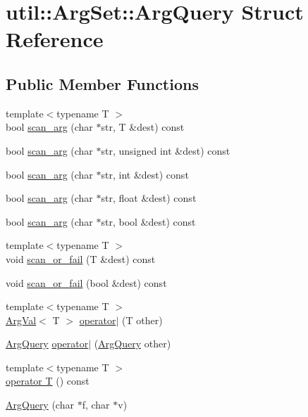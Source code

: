 \hypertarget{structutil_1_1ArgSet_1_1ArgQuery}{\section{util\-:\-:Arg\-Set\-:\-:Arg\-Query Struct Reference}
\label{structutil_1_1ArgSet_1_1ArgQuery}
}
\subsection*{Public Member Functions}
\begin{DoxyCompactItemize}
\item 
{\footnotesize template$<$typename T $>$ }\\bool \hyperlink{structutil_1_1ArgSet_1_1ArgQuery_a501daf29023e9ded1ba2d652251c3b9e}{scan\-\_\-arg} (char $\ast$str, T \&dest) const 
\item 
bool \hyperlink{structutil_1_1ArgSet_1_1ArgQuery_ac9c13ea0a2331353191ff437d2e527a9}{scan\-\_\-arg} (char $\ast$str, unsigned int \&dest) const 
\item 
bool \hyperlink{structutil_1_1ArgSet_1_1ArgQuery_add2d0c50323c1753c95bd4a57f2ea32d}{scan\-\_\-arg} (char $\ast$str, int \&dest) const 
\item 
bool \hyperlink{structutil_1_1ArgSet_1_1ArgQuery_ac37b8bef6e75eda51539bba50b0ea72c}{scan\-\_\-arg} (char $\ast$str, float \&dest) const 
\item 
bool \hyperlink{structutil_1_1ArgSet_1_1ArgQuery_adb6202f70c2615bd93cb7c7715f72702}{scan\-\_\-arg} (char $\ast$str, bool \&dest) const 
\item 
{\footnotesize template$<$typename T $>$ }\\void \hyperlink{structutil_1_1ArgSet_1_1ArgQuery_a4274c4be1942f0c1385f7cef9ba565d6}{scan\-\_\-or\-\_\-fail} (T \&dest) const 
\item 
void \hyperlink{structutil_1_1ArgSet_1_1ArgQuery_a47c0bbc811459ede79853e9acd8d1e79}{scan\-\_\-or\-\_\-fail} (bool \&dest) const 
\item 
{\footnotesize template$<$typename T $>$ }\\\hyperlink{structutil_1_1ArgSet_1_1ArgVal}{Arg\-Val}$<$ T $>$ \hyperlink{structutil_1_1ArgSet_1_1ArgQuery_a6225c8e36fa1bcd7545327fbd67af74c}{operator$|$} (T other)
\item 
\hyperlink{structutil_1_1ArgSet_1_1ArgQuery}{Arg\-Query} \hyperlink{structutil_1_1ArgSet_1_1ArgQuery_a10140fa4db93b579763666a1c4fcc21f}{operator$|$} (\hyperlink{structutil_1_1ArgSet_1_1ArgQuery}{Arg\-Query} other)
\item 
{\footnotesize template$<$typename T $>$ }\\\hyperlink{structutil_1_1ArgSet_1_1ArgQuery_ae6bada8b662a9358dc944f3a071375fb}{operator T} () const 
\item 
\hyperlink{structutil_1_1ArgSet_1_1ArgQuery_a1b83946961b2e8f7581d7836e23136a2}{Arg\-Query} (char $\ast$f, char $\ast$v)
\end{DoxyCompactItemize}
